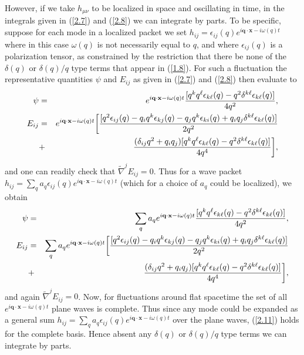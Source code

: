 \documentclass[aps,onecolumn,10pt]{revtex4}
\numberwithin{equation}{section}
\numberwithin{equation}{section}
\begin{document}
However, if we take $h_{\mu\nu}$  to be localized in space and oscillating in time, in the integrals given in (\ref{2.7}) and (\ref{2.8}) we can integrate by parts. To be specific, suppose for each mode in a localized packet we set $h_{ij}=\epsilon_{ij}(q)e^{i\mathbf{q}\cdot\mathbf{x}-i\omega(q) t}$ where in this case $\omega(q)$ is not necessarily equal to $q$, and where $\epsilon_{ij}(q)$ is a polarization tensor, as constrained by the restriction that there be none of the $\delta(q)$ or $\delta(q)/q$ type terms that appear in (\ref{1.8}). For such a fluctuation the representative quantities $\psi$ and $E_{ij}$ as given in (\ref{2.7}) and (\ref{2.8}) then evaluate to
%
\begin{eqnarray}
\psi&=&e^{i\mathbf{q}\cdot\mathbf{x}-i\omega(q) t}\frac{[q^kq^{\ell}\epsilon_{k\ell}(q)-q^2\delta^{k\ell}\epsilon_{k\ell}(q)]}{4q^2},
\nonumber\\
E_{ij}&=&e^{i\mathbf{q}\cdot\mathbf{x}-i\omega(q) t}\bigg{[}\frac{[q^2\epsilon_{ij}(q)-q_iq^k\epsilon_{kj}(q)-q_jq^k\epsilon_{ki}(q)+q_iq_j\delta^{k\ell}\epsilon_{k\ell}(q)]}{2q^2}
\nonumber\\
&+&\frac{(\delta_{ij}q^2+q_iq_j)[q^kq^{\ell}\epsilon_{k\ell}(q)-q^2\delta^{k\ell}\epsilon_{k\ell}(q)]}{4q^4}\bigg{]},
\label{2.10}
\end{eqnarray}
%
and one can readily check that $\tilde{\nabla}^jE_{ij}=0$. Thus for a wave packet  $h_{ij}=\sum_qa_q\epsilon_{ij}(q)e^{i\mathbf{q}\cdot\mathbf{x}-i\omega(q) t}$ (which for a choice of $a_q$ could be localized), we obtain 
%
\begin{eqnarray}
\psi&=&\sum_qa_qe^{i\mathbf{q}\cdot\mathbf{x}-i\omega(q) t}\frac{[q^kq^{\ell}\epsilon_{k\ell}(q)-q^2\delta^{k\ell}\epsilon_{k\ell}(q)]}{4q^2},
\nonumber\\
E_{ij}&=&\sum_qa_qe^{i\mathbf{q}\cdot\mathbf{x}-i\omega(q) t}\bigg{[}\frac{[q^2\epsilon_{ij}(q)-q_iq^k\epsilon_{kj}(q)-q_jq^k\epsilon_{ki}(q)+q_iq_j\delta^{k\ell}\epsilon_{k\ell}(q)]}{2q^2}
\nonumber\\
&+&\frac{(\delta_{ij}q^2+q_iq_j)[q^kq^{\ell}\epsilon_{k\ell}(q)-q^2\delta^{k\ell}\epsilon_{k\ell}(q)]}{4q^4}\bigg{]},
\label{2.11}
\end{eqnarray}
%
and again $\tilde{\nabla}^jE_{ij}=0$. Now, for fluctuations around flat spacetime the set of all $e^{i\mathbf{q}\cdot\mathbf{x}-i\omega (q)t}$ plane waves is complete. Thus since any mode could be expanded as a general sum $h_{ij}=\sum_qa_q\epsilon_{ij}(q)e^{i\mathbf{q}\cdot\mathbf{x}-i\omega(q) t}$ over the plane waves, (\ref{2.11}) holds for the complete basis. Hence absent any $\delta(q)$ or $\delta (q)/q$ type terms we can  integrate by parts.
\end{document}
